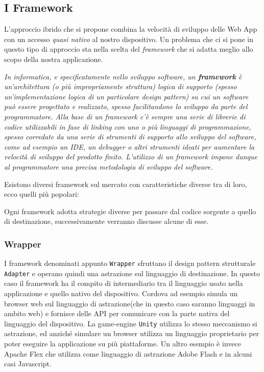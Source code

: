 \subsection{I Framework}
L'approccio ibrido che si propone combina la velocità di sviluppo delle Web App con un accesso \emph{quasi nativo} al nostro dispositivo. Un problema che ci si pone in questo tipo di approccio sta nella scelta del \emph{framework} che si adatta  meglio allo scopo della nostra applicazione.

\textit{In informatica, e specificatamente nello sviluppo software, un \textbf{framework} è un'architettura (o più impropriamente struttura) logica di supporto (spesso un'implementazione logica di un particolare design pattern) su cui un software può essere progettato e realizzato, spesso facilitandone lo sviluppo da parte del programmatore. Alla base di un framework c'è sempre una serie di librerie di codice utilizzabili in fase di linking con uno o più linguaggi di programmazione, spesso corredate da una serie di strumenti di supporto allo sviluppo del software, come ad esempio un IDE, un debugger o altri strumenti ideati per aumentare la velocità di sviluppo del prodotto finito. L'utilizzo di un framework impone dunque al programmatore una precisa metodologia di sviluppo del software.}\\
\hspace*{\fill}\cite{wiki:framework}

Esistono diversi framework sul mercato con caratteristiche diverse tra di loro, ecco quelli più popolari:


Ogni framework adotta strategie diverse per passare dal codice sorgente a quello di destinazione, successivamente verranno discusse alcune di esse.

\subsubsection{Wrapper}
I framework denominati appunto \texttt{Wrapper} sfruttano il design pattern strutturale \texttt{Adapter} e operano quindi una astrazione sul linguaggio di destinazione. In questo caso il framework ha il compito di intermediario tra il linguaggio usato nella applicazione e quello nativo del dispositivo.
Cordova ad esempio simula un browser web sul linguaggio di astrazione(che in questo caso saranno linguaggi in ambito web) e fornisce delle API per comunicare con la parte nativa del linguaggio del dispositivo.
La game-engine \texttt{Unity} utilizza lo stesso meccanismo si astrazione, ed anziché simulare un browser utilizza un linguaggio proprietario per poter eseguire la applicazione su più piattaforme.
Un altro esempio è invece Apache Flex che utilizza come linguaggio di astrazione Adobe Flash e in alcuni casi Javascript.
